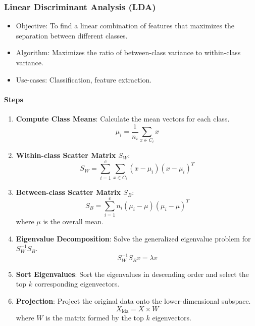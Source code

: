 \documentclass[english, threecolumn]{latex4ei/latex4ei_sheet}
\begin{document}
\begin{sectionbox}
\subsubsection{Linear Discriminant Analysis (LDA)}
\begin{itemize}
    \item Objective: To find a linear combination of features that maximizes the separation between different classes.
    \item Algorithm: Maximizes the ratio of between-class variance to within-class variance.
    \item Use-cases: Classification, feature extraction.
\end{itemize}
\paragraph{Steps}
\begin{enumerate}
    \item \textbf{Compute Class Means}: Calculate the mean vectors for each class.
    \[
    \mu_i = \frac{1}{n_i} \sum_{x \in C_i} x
    \]
    
    \item \textbf{Within-class Scatter Matrix \(S_W\)}:
    \[
    S_W = \sum_{i=1}^{c} \sum_{x \in C_i} (x - \mu_i) (x - \mu_i)^T
    \]
    
    \item \textbf{Between-class Scatter Matrix \(S_B\)}:
    \[
    S_B = \sum_{i=1}^{c} n_i (\mu_i - \mu) (\mu_i - \mu)^T
    \]
    where \(\mu\) is the overall mean.
    
    \item \textbf{Eigenvalue Decomposition}: Solve the generalized eigenvalue problem for \(S_W^{-1} S_B\).
    \[
    S_W^{-1} S_B v = \lambda v
    \]
    
    \item \textbf{Sort Eigenvalues}: Sort the eigenvalues in descending order and select the top \(k\) corresponding eigenvectors.
    
    \item \textbf{Projection}: Project the original data onto the lower-dimensional subspace.
    \[
    X_{\text{lda}} = X \times W
    \]
    where \(W\) is the matrix formed by the top \(k\) eigenvectors.
\end{enumerate}
\end{sectionbox}
\end{document}
